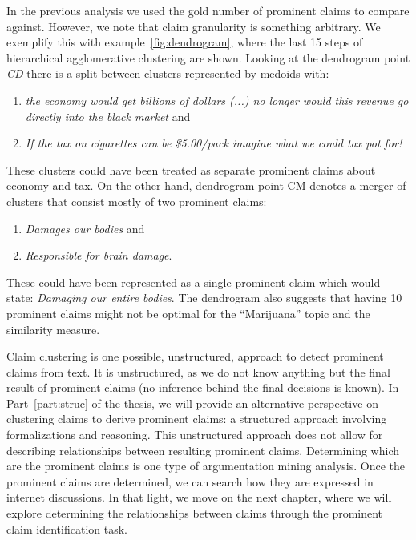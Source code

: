 In the previous analysis we used the gold number of prominent claims to compare
against. However, we note that claim granularity is something arbitrary. 
We exemplify this with example~\ref{fig:dendrogram}, where the last 15 steps of
hierarchical agglomerative clustering are shown. 
Looking at the dendrogram point \emph{CD} there is a split between clusters
represented by medoids with: 
\begin{enumerate}[label=(\arabic*)]
\item \textit{the economy would get billions of dollars (...) no longer 
	would this revenue
go directly into the black market} and 
\item \textit{If the tax on cigarettes can
be \$5.00/pack imagine what we could tax pot for!}
\end{enumerate}
These clusters could have been treated as separate prominent claims about
economy and tax. 
On the other hand, dendrogram point CM denotes a merger of clusters that
consist mostly of two prominent claims: 
\begin{enumerate}[label=(\arabic*)]
\item \textit{Damages our bodies} and 
\item \textit{Responsible for brain damage}.
\end{enumerate}
These could have been represented as a single prominent claim which would state: 
\textit{Damaging our entire bodies}. 
The dendrogram also suggests that having 10 prominent claims might not be optimal 
for the ``Marijuana'' topic and the similarity measure. 

% 

Claim clustering is one possible, unstructured, approach to 
detect prominent claims from text.
It is unstructured, as we do not know anything but the final result of
prominent claims (no inference behind the final decisions is known). In
Part~\ref{part:struc} of the thesis, we will provide an
alternative perspective on clustering claims to derive prominent claims: a
structured approach involving formalizations and reasoning. This unstructured
approach does not allow for describing relationships between resulting
prominent claims. Determining which are the prominent claims is one type of 
argumentation mining analysis. Once the prominent claims are determined, we can
search how they are expressed in internet discussions. 
In that light, we move on the next chapter, where we will 
explore determining the relationships between claims through the 
prominent claim identification task. 

